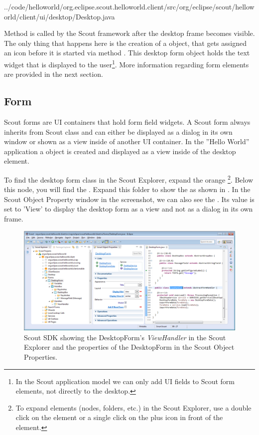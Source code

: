 \documentclass[a4paper,10pt,twoside]{book}
\begin{document}

{../code/helloworld/org.eclipse.scout.helloworld.client/src/org/eclipse/scout/helloworld/client/ui/desktop/Desktop.java}

Method  is called by the Scout framework after the desktop frame becomes visible.
The only thing that happens here is the creation of a  object, that gets assigned an icon before it is started via method .
This desktop form object holds the  text widget that is displayed to the user\footnote{
In the Scout application model we can only add UI fields to Scout form elements, not directly to the desktop.
}.
More information regarding form elements are provided in the next section.

\subsection{Form}

Scout forms are UI containers that hold form field widgets.
A Scout form always inherits from Scout class  and can either be displayed as a dialog in its own window or shown as a view inside of another UI container.
In the ''Hello World'' application a  object is created and displayed as a view inside of the desktop element.

To find the desktop form class in the Scout Explorer, expand the orange \footnote{
To expand elements (nodes, folders, etc.) in the Scout Explorer, use a double click on the element or a single click on the plus icon in front of the element.}.
Below this node, you will find the . 
Expand this folder to show the  as shown in .
In the Scout Object Property window in the screenshot, we can also see the .
Its value is set to 'View' to display the desktop form as a view and not as a dialog in its own frame.

\begin{figure}
\includegraphics[width=15cm]{sdk_helloworld_viewhandler.png}
\caption{Scout SDK showing the DesktopForm's \textit{ViewHandler} in the Scout Explorer and the properties of the DesktopForm in the Scout Object Properties.}
\end{figure}
\end{document}
